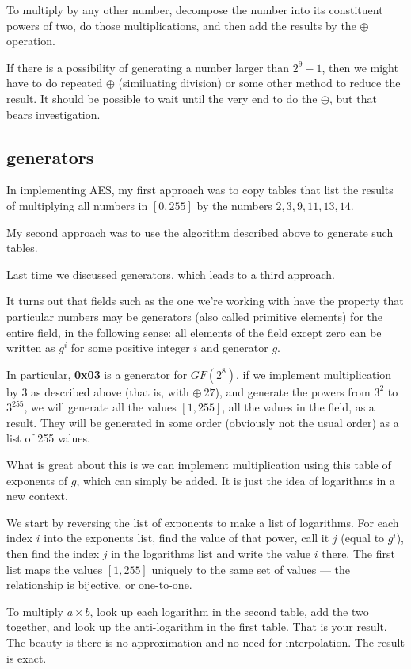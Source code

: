 \documentclass[11pt, oneside]{article}
\begin{document}
To multiply by any other number, decompose the number into its constituent powers of two, do those multiplications, and then add the results by the $\oplus$ operation.

If there is a possibility of generating a number larger than $2^9 - 1$, then we might have to do repeated $\oplus$ (similuating division) or some other method to reduce the result.  It should be possible to wait until the very end to do the $\oplus$, but that bears investigation.

\subsection*{generators}
In implementing AES, my first approach was to copy tables that list the results of multiplying all numbers in $[0,255]$ by the numbers $2, 3, 9, 11, 13, 14$.

My second approach was to use the algorithm described above to generate such tables.

Last time we discussed generators, which leads to a third approach.

It turns out that fields such as the one we're working with have the property that particular numbers may be generators (also called primitive elements) for the entire field, in the following sense:  all elements of the field except zero can be written as $g^i$ for some positive integer $i$ and generator $g$.  

In particular, \textbf{0x03} is a generator for $GF(2^8)$.  if we implement multiplication by $3$ as described above (that is, with $\oplus \ 27$), and generate the powers from $3^2$ to $3^{255}$, we will generate all the values $[1,255]$, all the values in the field, as a result.  They will be generated in some order (obviously not the usual order) as a list of 255 values.

What is great about this is we can implement multiplication using this table of exponents of $g$, which can simply be added.  It is just the idea of logarithms in a new context.  

We start by reversing the list of exponents to make a list of logarithms. For each index $i$ into the exponents list, find the value of that power, call it $j$ (equal to $g^i$), then find the index $j$ in the logarithms list and write the value $i$ there.  The first list maps the values $[1,255]$ uniquely to the same set of values --- the relationship is bijective, or one-to-one.

To multiply $a \times b$, look up each logarithm in the second table, add the two together, and look up the anti-logarithm in the first table.  That is your result.  The beauty is there is no approximation and no need for interpolation.  The result is exact.
\end{document}
